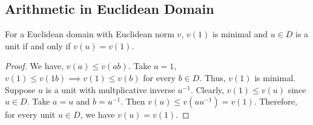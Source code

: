 \subsection{Arithmetic in Euclidean Domain}
\begin{theorem}
	For a Euclidean domain with Euclidean norm $v$, $v(1)$ is minimal and $u \in D$ is a unit if and only if $v(u) = v(1)$.
\end{theorem}
\begin{proof}
	We have, $v(a) \le v(ab)$.
	Take $a = 1$, $v(1) \le v(1b) \implies v(1) \le v(b)$ for every $b \in D$.
	Thus, $v(1)$ is minimal.\\

	Suppose $u$ is a unit with multplicative inverse $u^{-1}$.
	Clearly, $v(1) \le v(u)$ since $u \in D$.
	Take $a = u$ and $b = u^{-1}$.
	Then $v(u) \le v(uu^{-1}) = v(1)$.
	Therefore, for every unit $u \in D$, we have $v(u) = v(1)$.
\end{proof}

